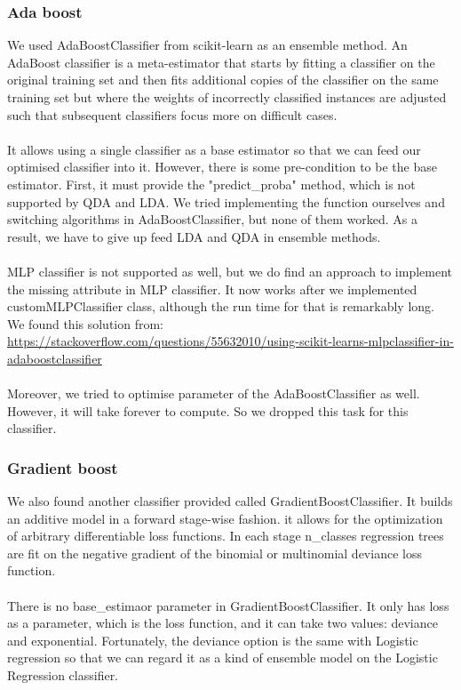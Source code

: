 \documentclass{article}
\begin{document}
\subsubsection{Ada boost}
We used AdaBoostClassifier from scikit-learn as an ensemble method. An AdaBoost classifier is a meta-estimator that starts by fitting a classifier on the original training set and then fits additional copies of the classifier on the same training set but where the weights of incorrectly classified instances are adjusted such that subsequent classifiers focus more on difficult cases.\cite{5}\\\\
It allows using a single classifier as a base estimator so that we can feed our optimised classifier into it. However, there is some pre-condition to be the base estimator. First, it must provide the "predict\_proba" method, which is not supported by QDA and LDA. We tried implementing the function ourselves and switching algorithms in AdaBoostClassifier, but none of them worked. As a result, we have to give up feed LDA and QDA in ensemble methods. \\\\
MLP classifier is not supported as well, but we do find an approach to implement the missing attribute in MLP classifier. It now works after we implemented customMLPClassifier class, although the run time for that is remarkably long. We found this solution from: \url{https://stackoverflow.com/questions/55632010/using-scikit-learns-mlpclassifier-in-adaboostclassifier}\\\\
Moreover, we tried to optimise parameter of the AdaBoostClassifier as well. However, it will take forever to compute. So we dropped this task for this classifier.

\subsubsection{Gradient boost}
We also found another classifier provided called GradientBoostClassifier. It builds an additive model in a forward stage-wise fashion. it allows for the optimization of arbitrary differentiable loss functions. In each stage n\_classes regression trees are fit on the negative gradient of the binomial or multinomial deviance loss function. \cite{5}\\\\
There is no base\_estimaor parameter in GradientBoostClassifier. It only has loss as a parameter, which is the loss function, and it can take two values: deviance and exponential. Fortunately, the deviance option is the same with Logistic regression so that we can regard it as a kind of ensemble model on the Logistic Regression classifier.
\end{document}
